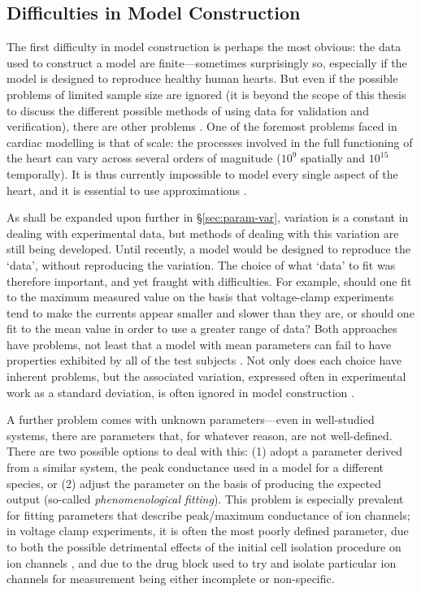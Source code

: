 \documentclass[../thesis-main.tex]{subfiles}
\begin{document}
\subsection{Difficulties in Model Construction}
\label{subsec:model-difficulties}
The first difficulty in model construction is perhaps the most obvious: the data used to construct a model are finite---sometimes surprisingly so, especially if the model is designed to reproduce healthy human hearts. But even if the possible problems of limited sample size are ignored (it is beyond the scope of this thesis to discuss the different possible methods of using data for validation and verification), there are other problems \citep{Marder2011}. One of the foremost problems faced in cardiac modelling is that of scale: the processes involved in the full functioning of the heart can vary across several orders of magnitude ($10^9$ spatially and $10^15$ temporally). It is thus currently impossible to model every single aspect of the heart, and it is essential to use approximations \citep{Abramson2010}.

As shall be expanded upon further in \S\ref{sec:param-var}, variation is a constant in dealing with experimental data, but methods of dealing with this variation are still being developed. Until recently, a model would be designed to reproduce the `data', without reproducing the variation. The choice of what `data' to fit was therefore important, and yet fraught with difficulties. For example, should one fit to the maximum measured value on the basis that voltage-clamp experiments tend to make the currents appear smaller and slower than they are, or should one fit to the mean value in order to use a greater range of data? Both approaches have problems, not least that a model with mean parameters can fail to have properties exhibited by all of the test subjects \citep{Golowasch2002, Marder2011}. Not only does each choice have inherent problems, but the associated variation, expressed often in experimental work as a standard deviation, is often ignored in model construction \citep{Carusi2012}.

A further problem comes with unknown parameters---even in well-studied systems, there are parameters that, for whatever reason, are not well-defined. There are two possible options to deal with this: (1) adopt a parameter derived from a similar system, \eg{} the peak conductance used in a model for a different species, or (2) adjust the parameter on the basis of producing the expected output (so-called \emph{phenomenological fitting}). This problem is especially prevalent for fitting parameters that describe peak/maximum conductance of ion channels; in voltage clamp experiments, it is often the most poorly defined parameter, due to both the possible detrimental effects of the initial cell isolation procedure on ion channels \citep{Yue1996}, and due to the drug block used to try and isolate particular ion channels for measurement being either incomplete or non-specific.
\end{document}

